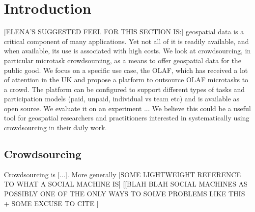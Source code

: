 \section{Introduction}

[ELENA'S SUGGESTED FEEL FOR THIS SECTION IS:] geospatial data is a critical component of many applications. Yet not all of it is readily available, and when available, its use is associated with high costs. We look at crowdsourcing, in particular microtask crowdsourcing, as a means to offer geospatial data for the public good. We focus on a specific use case, the OLAF, which has received a lot of attention in the UK and propose a platform to outsource OLAF microtasks to a crowd. The platform can be configured to support different types of tasks and participation models (paid, unpaid, individual vs team etc) and is available as open source. We evaluate it on an experiment ... We believe this could be a useful tool for geospatial researchers and practitioners interested in systematically using crowdsourcing in their daily work.

\subsection{Crowdsourcing}

    Crowdsourcing is {[}...{]}. More generally {[}SOME LIGHTWEIGHT REFERENCE TO WHAT A SOCIAL MACHINE IS{]} [{[}BLAH BLAH SOCIAL MACHINES AS POSSIBLY ONE OF THE ONLY WAYS TO SOLVE PROBLEMS LIKE THIS + SOME EXCUSE TO CITE \cite{OReilly:2015uo}{]}

